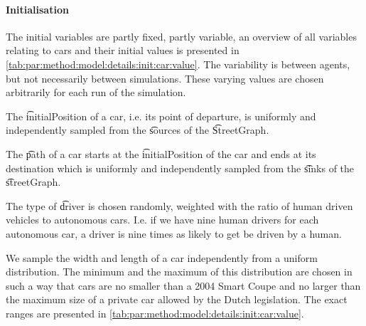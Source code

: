 \paragraph{Initialisation}
\label{par:method:model:details:initialization}
The initial variables are partly fixed, partly variable, an overview of all variables relating to cars and their initial values is presented in \cref{tab:par:method:model:details:init:car:value}. The variability is between agents, but not necessarily between simulations. These varying values are chosen arbitrarily for each run of the simulation.


The \t{initialPosition} of a car, i.e. its point of departure, is uniformly and independently sampled from the \t{sources} of the \t{StreetGraph}. 

The \t{path} of a car starts at the \t{initialPosition} of the car and ends at its destination which is uniformly and independently sampled from the \t{sinks} of the \t{streetGraph}.

The type of \t{driver} is chosen randomly, weighted with the ratio of human driven vehicles to autonomous cars. I.e. if we have nine human drivers for each autonomous car, a driver is nine times as likely to get be driven by a human. 

We sample the width and length of a car independently from a uniform distribution. The minimum and the maximum of this distribution are chosen in such a way that cars are no smaller than a 2004 Smart Coupe and no larger than the maximum size of a private car allowed by the Dutch legislation. The exact ranges are presented in \cref{tab:par:method:model:details:init:car:value}.


